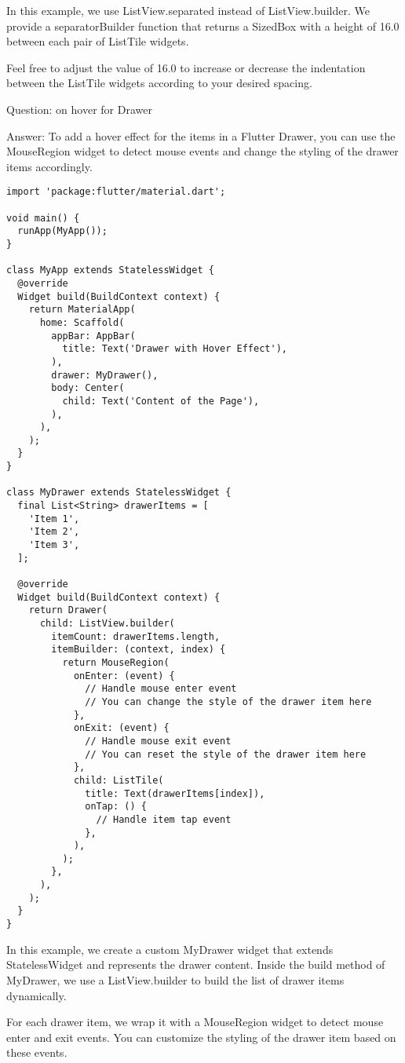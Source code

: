 In this example, we use ListView.separated instead of ListView.builder. We provide a separatorBuilder function that 
returns a SizedBox with a height of 16.0 between each pair of ListTile widgets.

Feel free to adjust the value of 16.0 to increase or decrease the indentation between the ListTile widgets according 
to your desired spacing.


Question: on hover for Drawer

Answer: To add a hover effect for the items in a Flutter Drawer, you can use the MouseRegion widget to detect mouse 
events and change the styling of the drawer items accordingly. 

\begin{lstlisting}
import 'package:flutter/material.dart';

void main() {
  runApp(MyApp());
}

class MyApp extends StatelessWidget {
  @override
  Widget build(BuildContext context) {
    return MaterialApp(
      home: Scaffold(
        appBar: AppBar(
          title: Text('Drawer with Hover Effect'),
        ),
        drawer: MyDrawer(),
        body: Center(
          child: Text('Content of the Page'),
        ),
      ),
    );
  }
}

class MyDrawer extends StatelessWidget {
  final List<String> drawerItems = [
    'Item 1',
    'Item 2',
    'Item 3',
  ];

  @override
  Widget build(BuildContext context) {
    return Drawer(
      child: ListView.builder(
        itemCount: drawerItems.length,
        itemBuilder: (context, index) {
          return MouseRegion(
            onEnter: (event) {
              // Handle mouse enter event
              // You can change the style of the drawer item here
            },
            onExit: (event) {
              // Handle mouse exit event
              // You can reset the style of the drawer item here
            },
            child: ListTile(
              title: Text(drawerItems[index]),
              onTap: () {
                // Handle item tap event
              },
            ),
          );
        },
      ),
    );
  }
}
\end{lstlisting}

In this example, we create a custom MyDrawer widget that extends StatelessWidget and represents the drawer content. 
Inside the build method of MyDrawer, we use a ListView.builder to build the list of drawer items dynamically.

For each drawer item, we wrap it with a MouseRegion widget to detect mouse enter and exit events. You can customize 
the styling of the drawer item based on these events.

